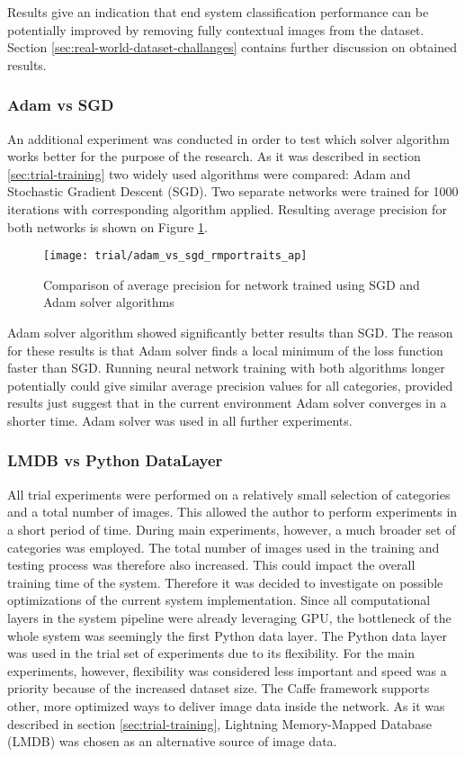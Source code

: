     Results give an indication that end system classification performance can be potentially improved by removing fully contextual images from the dataset. Section \ref{sec:real-world-dataset-challanges} contains further discussion on obtained results.

    
\subsubsection{Adam vs SGD}
    An additional experiment was conducted in order to test which solver algorithm works better for the purpose of the research. As it was described in section \ref{sec:trial-training} two widely used algorithms were compared: Adam and Stochastic Gradient Descent (SGD). Two separate networks were trained for 1000 iterations with corresponding algorithm applied. Resulting average precision for both networks is shown on Figure \ref{fig:trial-sgd-vs-adam}.

    \begin{figure}[H]
        \centering
        \texttt{[image: trial/adam\_vs\_sgd\_rmportraits\_ap]}
        \caption{Comparison of average precision for network trained using SGD and Adam solver algorithms}
        \label{fig:trial-sgd-vs-adam}
    \end{figure}
    
    Adam solver algorithm showed significantly better results than SGD. The reason for these results is that Adam solver finds a local minimum of the loss function faster than SGD. Running neural network training with both algorithms longer potentially could give similar average precision values for all categories, provided results just suggest that in the current environment Adam solver converges in a shorter time. Adam solver was used in all further experiments.
    
    
\subsubsection{LMDB vs Python DataLayer}
    All trial experiments were performed on a relatively small selection of categories and a total number of images. This allowed the author to perform experiments in a short period of time. During main experiments, however, a much broader set of categories was employed. The total number of images used in the training and testing process was therefore also increased. This could impact the overall training time of the system. Therefore it was decided to investigate on possible optimizations of the current system implementation. Since all computational layers in the system pipeline were already leveraging GPU, the bottleneck of the whole system was seemingly the first Python data layer. The Python data layer was used in the trial set of experiments due to its flexibility. For the main experiments, however, flexibility was considered less important and speed was a priority because of the increased dataset size. The Caffe framework supports other, more optimized ways to deliver image data inside the network. As it was described in section \ref{sec:trial-training}, Lightning Memory-Mapped Database (LMDB) was chosen as an alternative source of image data.
    
